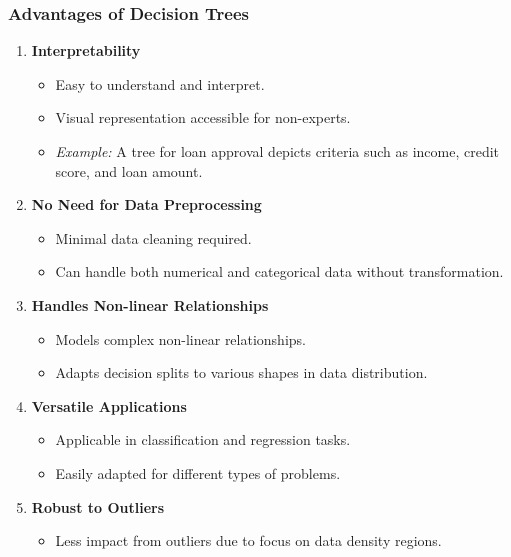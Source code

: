 \documentclass[aspectratio=169]{beamer}
\begin{document}
\begin{frame}[fragile]
    \frametitle{Advantages of Decision Trees}
    \begin{enumerate}
        \item \textbf{Interpretability}  
        \begin{itemize}
            \item Easy to understand and interpret.
            \item Visual representation accessible for non-experts.
            \item \textit{Example:} A tree for loan approval depicts criteria such as income, credit score, and loan amount.
        \end{itemize}
        
        \item \textbf{No Need for Data Preprocessing}  
        \begin{itemize}
            \item Minimal data cleaning required.
            \item Can handle both numerical and categorical data without transformation.
        \end{itemize}

        \item \textbf{Handles Non-linear Relationships}  
        \begin{itemize}
            \item Models complex non-linear relationships.
            \item Adapts decision splits to various shapes in data distribution.
        \end{itemize}
        
        \item \textbf{Versatile Applications}  
        \begin{itemize}
            \item Applicable in classification and regression tasks.
            \item Easily adapted for different types of problems.
        \end{itemize}
        
        \item \textbf{Robust to Outliers}  
        \begin{itemize}
            \item Less impact from outliers due to focus on data density regions.
        \end{itemize}
    \end{enumerate}
\end{frame}
\end{document}
